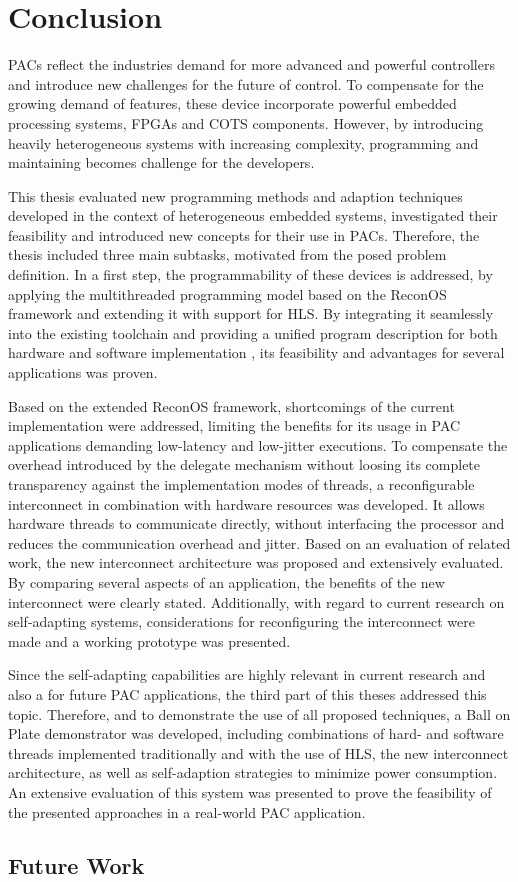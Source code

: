 \chapter{Conclusion}
\label{sec:conclusion}
\aclp{PAC} reflect the industries demand for more advanced and powerful
controllers and introduce new challenges for the future of control. To
compensate for the growing demand of features, these device incorporate
powerful embedded processing systems, \acp{FPGA} and \ac{COTS} components.
However, by introducing heavily heterogeneous systems with increasing
complexity, programming and maintaining becomes challenge for the developers.

This thesis evaluated new programming methods and adaption
techniques developed in the context of heterogeneous embedded systems,
investigated their feasibility and introduced new concepts for their use in
\acp{PAC}. Therefore, the thesis included three main subtasks, motivated from
the posed problem definition. In a first step, the programmability of these
devices is addressed, by applying the multithreaded programming model based on
the ReconOS framework and extending it with support for \ac{HLS}. By
integrating it seamlessly into the existing toolchain and providing a unified
program description for both hardware and software implementation , its
feasibility and advantages for several applications was proven.

Based on the extended ReconOS framework, shortcomings of the current
implementation were addressed, limiting the benefits for its usage in
\ac{PAC} applications demanding low-latency and low-jitter executions. To
compensate the overhead introduced by the delegate mechanism without loosing
its complete transparency against the implementation modes of threads, a
reconfigurable interconnect in combination with hardware resources was
developed. It allows hardware threads to communicate directly, without
interfacing the processor and reduces the communication overhead and jitter.
Based on an evaluation of related work, the new interconnect architecture was
proposed and extensively evaluated. By comparing several aspects of an
application, the benefits of the new interconnect were clearly stated.
Additionally, with regard to current research on self-adapting systems,
considerations for reconfiguring the interconnect were made and a working
prototype was presented.

Since the self-adapting capabilities are highly relevant in current research
and also a for future \ac{PAC} applications, the third part of this theses
addressed this topic. Therefore, and to demonstrate the use of all proposed
techniques, a Ball on Plate demonstrator was developed, including combinations
of hard- and software threads implemented traditionally and with the use of
\ac{HLS}, the new interconnect architecture, as well as self-adaption
strategies to minimize power consumption. An extensive evaluation of this
system was presented to prove the feasibility of the presented approaches in a
real-world \ac{PAC} application.

\section{Future Work}
